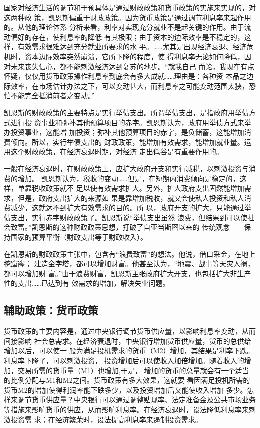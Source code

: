 国家对经济生活的调节和干预具体是通过财政政策和货币政策的实施来实现的，对这两种政
策，凯恩斯偏重于财政政策。因为货币政策是通过调节利息率来起作用的。从他的理论体系
分析来看，利率对实现充分就业不是起关键的作用。由于流动偏好的存在，使利息率的降低
有其极限；由于资本的边际效率是不稳定的，这样，有效需求很难达到充分就业所要求的水
平。……尤其是出现经济衰退、经济危机时，资本边际效率突然崩溃，它所下降的程度，使
得利息率无论如何降低，因对未来丧失信心，都不能刺激经济达到复苏的地步。“就我自己
而论，我现在有点怀疑，仅仅用货币政策操作利息率到底会有多大成就……理由是：各种资
本品之边际效率，在市场估计办法之下，可以变动甚大，而利息率之可能变动范围太狭，恐
怕不能完全抵消前者之变动。”

凯恩斯的财政政策的主要特点是实行举债支出。所谓举债支出，是指政府用举债方式进行投
资事业和弥补其他预算项目的赤字。凯恩斯认为，政府用举债方式来举办投资事业，这能增
加投资；弥补其他预算项目的赤字，是负储蓄，这能增加消费倾向。所以，实行举债支出的
财政政策，能增加有效需求，能增加就业量。运用这个财政政策，在经济衰退时期，对经济
走出低谷是有重要作用的。

一般在经济衰退时，在财政政策上，应扩大政府开支和实行减税，以刺激投资与消费的增加。
凯恩斯认为，税收的变动……但是，在短期内消费倾向是稳定的，这样，单靠税收政策就不
足以使有效需求扩大。另外，扩大政府支出固然能增加需求，但是，政府支出扩大的来源如
果是靠增加税收，就又会使私人投资和私人消费减少，这就达不到扩大有效需求的目的。所
以，政府开支的扩大，只能通过举债支出，实行赤字财政政策了。凯恩斯说“举债支出虽然
浪费，但结果到可以使社会致富。”凯恩斯的这种财政政策思想，打破了自亚当斯密以来的
传统观念——保持国家的预算平衡（财政支出等于财政收入）。

在凯恩斯的财政政策主张中，包含有“浪费致富”的想法。他说，借口采金，在地上挖窟窿；
建造金字塔，都可以增加财富。他甚至认为，“地震、战事等天灾人祸，都可以增加财
富。”由于浪费财富，凯恩斯主张政府扩大开支，也包括扩大非生产性的支出……已达到有
效需求的增加，解决失业问题。

\subsection{辅助政策：货币政策}

货币政策的主要内容是，通过中央银行调节货币供应量，以影响利息率变动，从而间接影响
社会总需求。在经济衰退时，中央银行增加货币供应量，货币的总供给增加以后，可以使一
般为满足投机需求的货币（M2）增加，其结果是利率下跌。利息率下降了，可以刺激投资，
投资增加后可以使收入加倍增加。随着收入的增加，交易所需的货币量（M1）也增加,于是，
增加的货币的总量就会有一个适当的比例分配与M1和M2之间。货币政策有多大效果，这就要
看因满足投机所需的货币M2的增加使得利润率能下跌多少，以及投资增加后又能使收入增加
多少。怎样来调节货币供应量？中央银行可以通过调整贴现率、法定准备金及公共市场业务
等措施来影响货币的供应，从而影响利息率。在经济衰退时，设法降低利息率来刺激投资需
求；在经济繁荣时，设法提高利息率来遏制投资需求。

